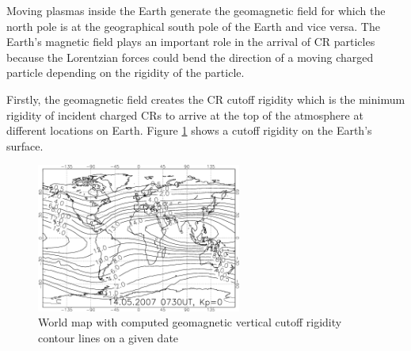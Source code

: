 Moving plasmas inside the Earth generate the geomagnetic field
for which the north pole is at the geographical south pole of
the Earth and vice versa.
The Earth's magnetic field plays
an important role in the arrival of CR particles because the Lorentzian 
forces could bend the direction of a moving charged particle depending 
on the rigidity of the particle.

Firstly,
the geomagnetic field creates the CR cutoff rigidity which is the
minimum rigidity of incident charged CRs to arrive at the top
of the atmosphere at different locations on Earth.
Figure \ref{fig:cr_map_rigidity} shows a cutoff
rigidity on the Earth's surface.

\begin{figure}[h!]
    \centering
    \includegraphics[width=0.6\textwidth]{content/literature_review/figures/map_cutoff_rigidity.png}
    \caption{ World map with computed geomagnetic vertical cutoff
        rigidity contour lines on a given date
        \citep*{map_cr_rigidity_cutoff}
    }
    \label{fig:cr_map_rigidity}
\end{figure}

